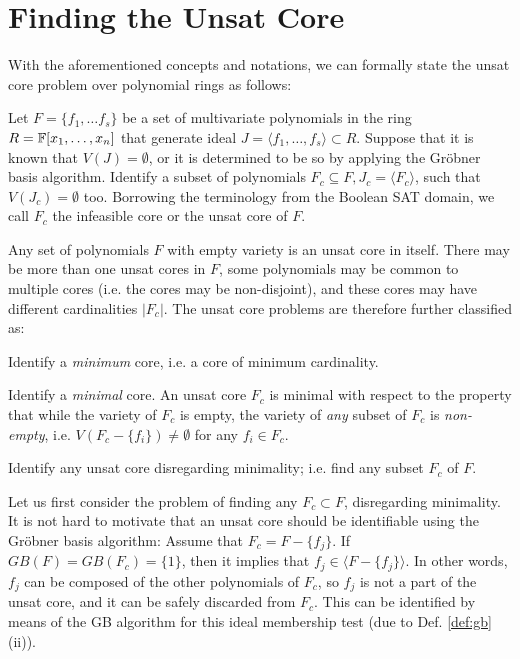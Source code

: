 \section{Finding the Unsat Core}
With the aforementioned concepts and notations, we can formally state
the unsat core problem over polynomial rings as follows: 

\begin{Problem}
Let $F = \{f_1, \dots f_s\}$ be a set of multivariate polynomials in
the ring $R = {\mathbb{F}}[x_1,\dots,x_n]$ that generate ideal $J = \langle
f_1,\dots,f_s\rangle \subset R$. Suppose that it is known that $V(J) =
\emptyset$, or it is determined to be so by applying the Gr\"obner
basis algorithm. Identify a subset of polynomials $F_c \subseteq F,
J_c = \langle F_c \rangle$, such that $V(J_c) = \emptyset$
too. Borrowing the terminology from the Boolean SAT domain, we
call $F_c$ the infeasible core or the unsat core of $F$. 
\end{Problem}

Any set of polynomials $F$ with empty variety is an unsat core in
itself. There may be more than one unsat cores in $F$, some
polynomials may be common to multiple cores (i.e. the
cores may be non-disjoint), and these cores may have
different cardinalities $|F_c|$. The unsat core problems
are therefore further classified as: 
\bi
\item Identify a {\it minimum} core, i.e. a core of minimum
  cardinality. 
\item Identify a {\it minimal} core. An unsat core $F_{c}$ is minimal
  with respect to the property that while the variety of $F_{c}$ is
  empty, the variety of {\it any} subset of $F_c$ is {\it non-empty},
  i.e. $V( F_{c} - \{f_i\} ) \neq \emptyset$ for any $f_i \in
  F_c$. 
\item Identify any unsat core disregarding minimality; i.e. find any
  subset $F_c$ of $F$.
\ei

Let us first consider the problem of finding any $F_c \subset F$,
disregarding minimality. It is not hard to motivate that an unsat
core should be identifiable using the Gr\"obner basis
algorithm: Assume that $F_c = F - \{f_j\}$. If $GB(F) = GB(F_c) =
\{1\}$, then it implies that $f_j \in \langle F - \{f_j\}\rangle$. In
other words, 
$f_j$ can be composed of the other polynomials of $F_c$, so $f_j$ is
not a part of the unsat core, and it can be safely discarded from
$F_c$. This can be identified by means of the GB algorithm for this
ideal membership test (due to Def. \ref{def:gb}(ii)). 

